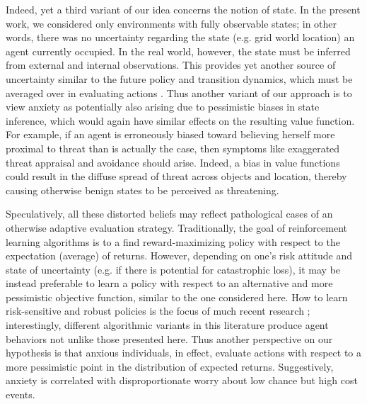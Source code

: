 \documentclass[11pt]{article} %
\begin{document}
Indeed, yet a third variant of our idea concerns the notion of state. In the present work, we considered only environments with fully observable states; in other words, there was no uncertainty regarding the state (e.g. grid world location) an agent currently occupied. In the real world, however, the state must be inferred from external and internal observations. This provides yet another source of uncertainty similar to the future policy and transition dynamics, which must be averaged over in evaluating actions \citep{kaelbling1998}. Thus another variant of our approach is to view anxiety as potentially also arising due to pessimistic biases in state inference\cite{Paulus2012}, which would again have similar effects on the resulting value function. For example, if an agent is erroneously biased toward believing herself more proximal to threat than is actually the case, then symptoms like exaggerated threat appraisal and avoidance should arise. Indeed, a bias in value functions could result in the diffuse spread of threat across objects\citep{norbury2018} and location\citep{schulz2018}, thereby causing otherwise benign states to be perceived as threatening. 

Speculatively, all these distorted beliefs may reflect pathological cases of an otherwise adaptive evaluation strategy. Traditionally, the goal of reinforcement learning algorithms is to a find reward-maximizing policy with respect to the expectation (average) of returns. However, depending on one's risk attitude and state of uncertainty (e.g. if there is potential for catastrophic loss), it may be instead preferable to learn a policy with respect to an alternative and more pessimistic objective function, similar to the one considered here. How to learn risk-sensitive and robust policies is the focus of much recent research \cite{morimura2012, chow2015, bellemare2017}; interestingly, different algorithmic variants in this literature produce agent behaviors not unlike those presented here. Thus another perspective on our hypothesis is that anxious individuals, in effect, evaluate actions with respect to a more pessimistic point in the distribution of expected returns. Suggestively, anxiety is correlated with disproportionate worry about low chance but high cost events\cite{Miceli2005}. 
\end{document}
